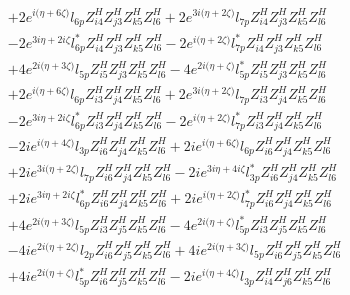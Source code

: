 \begin{align}
 &+2 e^{i \Big(\eta +6 \zeta \Big)} l_{6p} Z_{{i 4}}^{H} Z_{{j 3}}^{H} Z_{{k 5}}^{H} Z_{{l 6}}^{H} +2 e^{3 i \Big(\eta +2 \zeta \Big)} l_{7p} Z_{{i 4}}^{H} Z_{{j 3}}^{H} Z_{{k 5}}^{H} Z_{{l 6}}^{H} \nonumber \\ 
 &-2 e^{3 i \eta +2 i \zeta } l_{6p}^* Z_{{i 4}}^{H} Z_{{j 3}}^{H} Z_{{k 5}}^{H} Z_{{l 6}}^{H} -2 e^{i \Big(\eta +2 \zeta \Big)} l_{7p}^* Z_{{i 4}}^{H} Z_{{j 3}}^{H} Z_{{k 5}}^{H} Z_{{l 6}}^{H} \nonumber \\ 
 &+4 e^{2 i \Big(\eta +3 \zeta \Big)} l_{5p} Z_{{i 5}}^{H} Z_{{j 3}}^{H} Z_{{k 5}}^{H} Z_{{l 6}}^{H} -4 e^{2 i \Big(\eta +\zeta \Big)} l_{5p}^* Z_{{i 5}}^{H} Z_{{j 3}}^{H} Z_{{k 5}}^{H} Z_{{l 6}}^{H} \nonumber \\ 
 &+2 e^{i \Big(\eta +6 \zeta \Big)} l_{6p} Z_{{i 3}}^{H} Z_{{j 4}}^{H} Z_{{k 5}}^{H} Z_{{l 6}}^{H} +2 e^{3 i \Big(\eta +2 \zeta \Big)} l_{7p} Z_{{i 3}}^{H} Z_{{j 4}}^{H} Z_{{k 5}}^{H} Z_{{l 6}}^{H} \nonumber \\ 
 &-2 e^{3 i \eta +2 i \zeta } l_{6p}^* Z_{{i 3}}^{H} Z_{{j 4}}^{H} Z_{{k 5}}^{H} Z_{{l 6}}^{H} -2 e^{i \Big(\eta +2 \zeta \Big)} l_{7p}^* Z_{{i 3}}^{H} Z_{{j 4}}^{H} Z_{{k 5}}^{H} Z_{{l 6}}^{H} \nonumber \\ 
 &-2 i e^{i \Big(\eta +4 \zeta \Big)} l_{3p} Z_{{i 6}}^{H} Z_{{j 4}}^{H} Z_{{k 5}}^{H} Z_{{l 6}}^{H} +2 i e^{i \Big(\eta +6 \zeta \Big)} l_{6p} Z_{{i 6}}^{H} Z_{{j 4}}^{H} Z_{{k 5}}^{H} Z_{{l 6}}^{H} \nonumber \\ 
 &+2 i e^{3 i \Big(\eta +2 \zeta \Big)} l_{7p} Z_{{i 6}}^{H} Z_{{j 4}}^{H} Z_{{k 5}}^{H} Z_{{l 6}}^{H} -2 i e^{3 i \eta +4 i \zeta } l_{3p}^* Z_{{i 6}}^{H} Z_{{j 4}}^{H} Z_{{k 5}}^{H} Z_{{l 6}}^{H} \nonumber \\ 
 &+2 i e^{3 i \eta +2 i \zeta } l_{6p}^* Z_{{i 6}}^{H} Z_{{j 4}}^{H} Z_{{k 5}}^{H} Z_{{l 6}}^{H} +2 i e^{i \Big(\eta +2 \zeta \Big)} l_{7p}^* Z_{{i 6}}^{H} Z_{{j 4}}^{H} Z_{{k 5}}^{H} Z_{{l 6}}^{H} \nonumber \\ 
 &+4 e^{2 i \Big(\eta +3 \zeta \Big)} l_{5p} Z_{{i 3}}^{H} Z_{{j 5}}^{H} Z_{{k 5}}^{H} Z_{{l 6}}^{H} -4 e^{2 i \Big(\eta +\zeta \Big)} l_{5p}^* Z_{{i 3}}^{H} Z_{{j 5}}^{H} Z_{{k 5}}^{H} Z_{{l 6}}^{H} \nonumber \\ 
 &-4 i e^{2 i \Big(\eta +2 \zeta \Big)} l_{2p} Z_{{i 6}}^{H} Z_{{j 5}}^{H} Z_{{k 5}}^{H} Z_{{l 6}}^{H} +4 i e^{2 i \Big(\eta +3 \zeta \Big)} l_{5p} Z_{{i 6}}^{H} Z_{{j 5}}^{H} Z_{{k 5}}^{H} Z_{{l 6}}^{H} \nonumber \\ 
 &+4 i e^{2 i \Big(\eta +\zeta \Big)} l_{5p}^* Z_{{i 6}}^{H} Z_{{j 5}}^{H} Z_{{k 5}}^{H} Z_{{l 6}}^{H} -2 i e^{i \Big(\eta +4 \zeta \Big)} l_{3p} Z_{{i 4}}^{H} Z_{{j 6}}^{H} Z_{{k 5}}^{H} Z_{{l 6}}^{H} \nonumber \\ 

\end{align}

